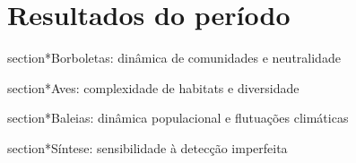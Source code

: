 \section{Resultados do período}


section*{Borboletas: dinâmica de comunidades e neutralidade} %
\label{sec:dinamica-temporal-borb} 

section*{Aves: complexidade de habitats e diversidade} %
\label{sec:compl-de-habit} 

section*{Baleias: dinâmica populacional e flutuações climáticas} %
\label{sec:dinam-popul-de} 

section*{Síntese: sensibilidade à detecção imperfeita} %
